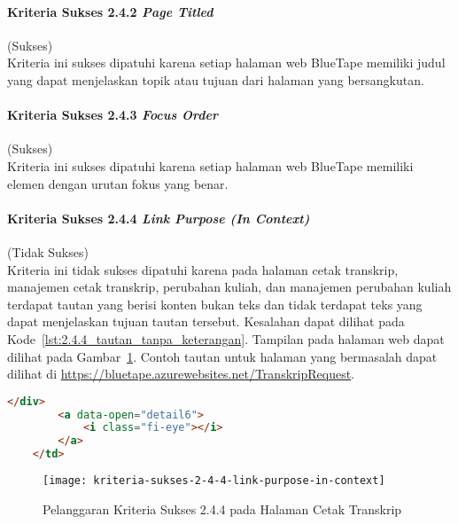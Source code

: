 \paragraph{Kriteria Sukses 2.4.2 \textit{Page Titled}}
\label{par:kepatuhan_bluetape_kriteria_sukses_2.4.2}
(Sukses)\\

Kriteria ini sukses dipatuhi karena setiap halaman web BlueTape memiliki judul yang dapat menjelaskan topik atau tujuan dari halaman yang bersangkutan.

\paragraph{Kriteria Sukses 2.4.3 \textit{Focus Order}}
\label{par:kepatuhan_bluetape_kriteria_sukses_2.4.3}
(Sukses)\\

Kriteria ini sukses dipatuhi karena setiap halaman web BlueTape memiliki elemen dengan urutan fokus yang benar. 

\paragraph{Kriteria Sukses 2.4.4 \textit{Link Purpose (In Context)}}
\label{par:kepatuhan_bluetape_kriteria_sukses_2.4.4}
(Tidak Sukses)\\

Kriteria ini tidak sukses dipatuhi karena pada halaman cetak transkrip, manajemen cetak transkrip, perubahan kuliah, dan manajemen perubahan kuliah terdapat tautan yang berisi konten bukan teks dan tidak terdapat teks yang dapat menjelaskan tujuan tautan tersebut. Kesalahan dapat dilihat pada \mbox{Kode \ref{lst:2.4.4_tautan_tanpa_keterangan}}. Tampilan pada halaman web dapat dilihat pada \mbox{Gambar \ref{fig:2.4.4_link_purpose_in_context}}. Contoh tautan untuk halaman yang bermasalah dapat dilihat di \url{https://bluetape.azurewebsites.net/TranskripRequest}.

\begin{lstlisting}[frame=single, label={lst:2.4.4_tautan_tanpa_keterangan}, language=HTML, caption=Pelanggaran Kriteria Sukses 2.4.4 pada Halaman Cetak Transkrip]
        </div>
        <a data-open="detail6">
            <i class="fi-eye"></i>
        </a>
    </td>
\end{lstlisting}

\begin{figure}[H]
    \centering  
    \texttt{[image: kriteria-sukses-2-4-4-link-purpose-in-context]}  
    \caption[Pelanggaran Kriteria Sukses 2.4.4 pada Halaman Cetak Transkrip]{Pelanggaran Kriteria Sukses 2.4.4 pada Halaman Cetak Transkrip}
    \label{fig:2.4.4_link_purpose_in_context}  
\end{figure} 

